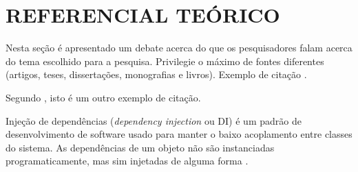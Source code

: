 \chapter{REFERENCIAL TEÓRICO}
Nesta seção é apresentado um debate acerca do que os pesquisadores falam acerca do tema escolhido para a pesquisa. Privilegie o máximo de fontes diferentes (artigos, teses, dissertações, monografias e livros). Exemplo de citação \cite{towfic2022benchmarking}.

Segundo , isto é um outro exemplo de citação.

\begin{citacao}
Injeção de dependências (\textit{dependency injection} ou DI) é um padrão de
desenvolvimento de software usado para manter o baixo acoplamento entre classes do
sistema. As dependências de um objeto não são instanciadas programaticamente, mas
sim injetadas de alguma forma \cite{chambers2021macbook}.
\end{citacao}
